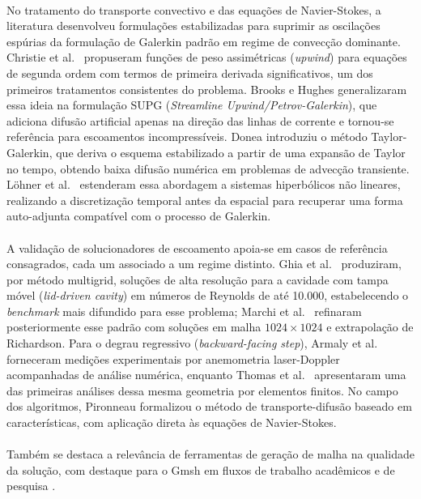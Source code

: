 \paragraph{}No tratamento do transporte convectivo e das equações de Navier-Stokes, a literatura desenvolveu formulações estabilizadas para suprimir as oscilações espúrias da formulação de Galerkin padrão em regime de convecção dominante. Christie et al.\ \cite{Christie1976} propuseram funções de peso assimétricas (\textit{upwind}) para equações de segunda ordem com termos de primeira derivada significativos, um dos primeiros tratamentos consistentes do problema. Brooks e Hughes \cite{Brooks1982} generalizaram essa ideia na formulação SUPG (\textit{Streamline Upwind/Petrov-Galerkin}), que adiciona difusão artificial apenas na direção das linhas de corrente e tornou-se referência para escoamentos incompressíveis. Donea \cite{Donea1984} introduziu o método Taylor-Galerkin, que deriva o esquema estabilizado a partir de uma expansão de Taylor no tempo, obtendo baixa difusão numérica em problemas de advecção transiente. Löhner et al.\ \cite{Lohner1984} estenderam essa abordagem a sistemas hiperbólicos não lineares, realizando a discretização temporal antes da espacial para recuperar uma forma auto-adjunta compatível com o processo de Galerkin.

\paragraph{}A validação de solucionadores de escoamento apoia-se em casos de referência consagrados, cada um associado a um regime distinto. Ghia et al.\ \cite{Ghia1982} produziram, por método multigrid, soluções de alta resolução para a cavidade com tampa móvel (\textit{lid-driven cavity}) em números de Reynolds de até 10.000, estabelecendo o \textit{benchmark} mais difundido para esse problema; Marchi et al.\ \cite{Marchi2009} refinaram posteriormente esse padrão com soluções em malha $1024 \times 1024$ e extrapolação de Richardson. Para o degrau regressivo (\textit{backward-facing step}), Armaly et al.\ \cite{Armaly1983} forneceram medições experimentais por anemometria laser-Doppler acompanhadas de análise numérica, enquanto Thomas et al.\ \cite{Thomas1981} apresentaram uma das primeiras análises dessa mesma geometria por elementos finitos. No campo dos algoritmos, Pironneau \cite{Pironneau1982} formalizou o método de transporte-difusão baseado em características, com aplicação direta às equações de Navier-Stokes.

\paragraph{}Também se destaca a relevância de ferramentas de geração de malha na qualidade da solução, com destaque para o Gmsh em fluxos de trabalho acadêmicos e de pesquisa \cite{Geuzaine2009}.

